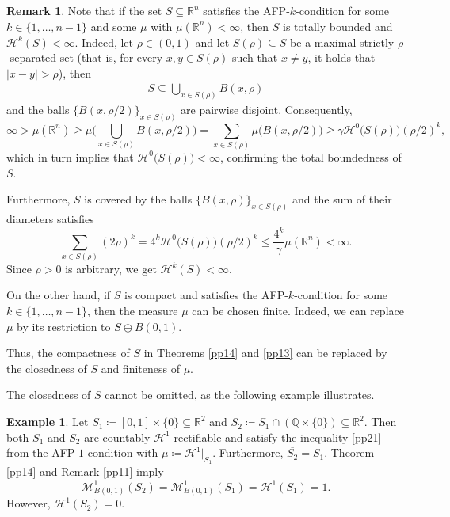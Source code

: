 \documentclass[pdflatex,sn-mathphys-num]{sn-jnl}
\theoremstyle{plain}
\theoremstyle{definition}
\newtheorem{rem}[theorem]{Remark}
\newtheorem{example}[theorem]{Example}
\begin{document}
\begin{rem}\label{pp15}
Note that if the set $S\subseteq\mathbb{R}^n$ satisfies the AFP-$k$-condition for some $k\in\{1, \dots, n-1\}$ and some $\mu$ with $\mu(\mathbb{R}^n)<\infty$, then $S$ is totally bounded and $\mathcal{H}^k(S)<\infty$. Indeed, let $\rho\in (0, 1)$ and let $S(\rho)\subseteq S$ be a maximal strictly $\rho$-separated set (that is, for every $x, y\in S(\rho)$ such that $x\neq y$, it holds that $|x-y|> \rho$), then \begin{align*}
    S\subseteq\bigcup_{x\in S(\rho)}B(x, \rho)
\end{align*} and the balls $\{B(x, \rho/2)\}_{x\in S(\rho)}$ are pairwise disjoint. Consequently, $$\infty>\mu(\mathbb{R}^n)\geq\mu\Big(\bigcup_{x\in S(\rho)} B(x, \rho/2)\Big)=\sum_{x\in S(\rho)}\mu\big(B(x, \rho/2)\big)\geq\gamma\mathcal{H}^{0}\big(S(\rho)\big)(\rho/2)^k,$$ which in turn implies that $\mathcal{H}^{0}\big(S(\rho)\big)<\infty$, confirming the total boundedness of $S$. 

Furthermore, $S$ is covered by the balls $\{B(x, \rho)\}_{x\in S(\rho)}$ and the sum of their diameters satisfies $$\sum_{x\in S(\rho)}(2\rho)^k=4^k\mathcal{H}^{0}\big(S(\rho)\big)(\rho/2)^k\leq\frac{4^k}{\gamma}\mu(\mathbb{R}^n)<\infty.$$ Since $\rho>0$ is arbitrary, we get $\mathcal{H}^k(S)<\infty.$

On the other hand, if $S$ is compact and satisfies the AFP-$k$-condition for some $k\in\{1, \dots, n-1\}$, then the measure $\mu$ can be chosen finite. Indeed, we can replace $\mu$ by its restriction to $S\oplus B(0, 1)$.

Thus, the compactness of $S$ in Theorems \ref{pp14} and \ref{pp13} can be replaced by the closedness of $S$ and finiteness of $\mu.$ 

The closedness of $S$ cannot be omitted, as the following example illustrates.
\end{rem}

\begin{example}
    Let $S_1\coloneqq [0, 1]\times\{0\}\subseteq\mathbb{R}^2$ and $S_2\coloneqq S_1\cap (\mathbb{Q}\times \{0\})\subseteq\mathbb{R}^2$. Then both $S_1$ and $S_2$ are countably $\mathcal{H}^1$-rectifiable and satisfy the inequality \eqref{pp21} from the AFP-$1$-condition with $\mu\coloneqq\mathcal{H}^1\big|_{S_1}$. Furthermore, $\overline{S_2}=S_1$. Theorem \ref{pp14} and Remark \ref{pp11} imply $$\mathcal{M}^1_{B(0,1)}(S_2)=\mathcal{M}^1_{B(0,1)}(S_1)=\mathcal{H}^1(S_1)=1.$$ However, $\mathcal{H}^1(S_2)=0.$ 
\end{example}
\medskip
\end{document}
